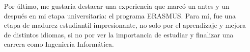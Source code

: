 	Por último, me gustaría destacar una experiencia que marcó un antes y un después en mi etapa universitaria: el programa ERASMUS. Para mí, fue una etapa de madurez estudiantil impresionante, no solo por el aprendizaje y mejora de distintos idiomas, si no por ver la importancia de estudiar y finalizar una carrera como Ingeniería Informática.